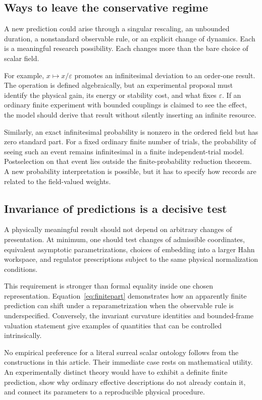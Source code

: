 \documentclass[11pt,a4paper]{article}
\numberwithin{equation}{section}
\theoremstyle{definition}
\theoremstyle{remark}
\newcommand{\eps}{\varepsilon}
\begin{document}
\subsection{Ways to leave the conservative regime}
A new prediction could arise through a singular rescaling, an unbounded duration, a nonstandard observable rule, or an explicit change of dynamics. Each is a meaningful research possibility. Each changes more than the bare choice of scalar field.

For example, $x\mapsto x/\eps$ promotes an infinitesimal deviation to an order-one result. The operation is defined algebraically, but an experimental proposal must identify the physical gain, its energy or stability cost, and what fixes $\eps$. If an ordinary finite experiment with bounded couplings is claimed to see the effect, the model should derive that result without silently inserting an infinite resource.

Similarly, an exact infinitesimal probability is nonzero in the ordered field but has zero standard part. For a fixed ordinary finite number of trials, the probability of seeing such an event remains infinitesimal in a finite independent-trial model. Postselection on that event lies outside the finite-probability reduction theorem. A new probability interpretation is possible, but it has to specify how records are related to the field-valued weights.

\subsection{Invariance of predictions is a decisive test}
A physically meaningful result should not depend on arbitrary changes of presentation. At minimum, one should test changes of admissible coordinates, equivalent asymptotic parametrizations, choices of embedding into a larger Hahn workspace, and regulator prescriptions subject to the same physical normalization conditions.

This requirement is stronger than formal equality inside one chosen representation. Equation~\eqref{eq:finitepart} demonstrates how an apparently finite prediction can shift under a reparametrization when the observable rule is underspecified. Conversely, the invariant curvature identities and bounded-frame valuation statement give examples of quantities that can be controlled intrinsically.

No empirical preference for a literal surreal scalar ontology follows from the constructions in this article. Their immediate case rests on mathematical utility. An experimentally distinct theory would have to exhibit a definite finite prediction, show why ordinary effective descriptions do not already contain it, and connect its parameters to a reproducible physical procedure.
\end{document}
